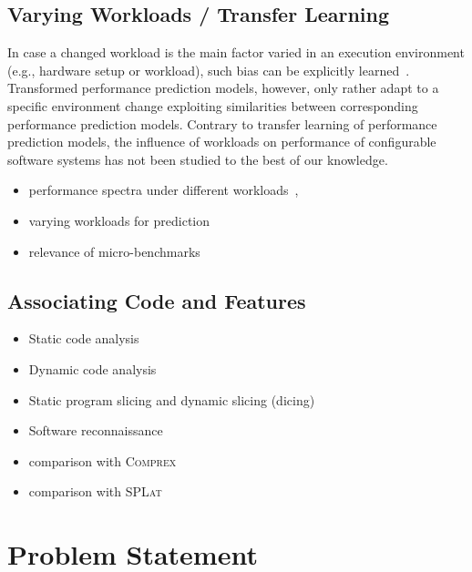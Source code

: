 \subsection{Varying Workloads / Transfer Learning}
In case a changed workload is the main factor varied in an execution environment (e.g., hardware setup or workload), such bias can be explicitly learned~\cite{jamishidi_transfer_2017,jamshidi_learning_2018,jamshidi_transfer_gp_2017,ding_bayesian_2020}. Transformed performance prediction models, however, only rather adapt to a specific environment change exploiting similarities between corresponding performance prediction models. Contrary to transfer learning of performance prediction models, the influence of workloads on performance of configurable software systems has not been studied to the best of our knowledge.

\begin{itemize}
	\item performance spectra under different workloads~\cite{alves_sampling_2020}, 
	\item varying workloads for prediction~\cite{liao_2020_using_emse}
	\item relevance of micro-benchmarks \cite{laaber_emse_2021,grambow_peerj_2021}
\end{itemize}

\subsection{Associating Code and Features}
\begin{itemize}
	\item Static code analysis\cite{velez_2020_configcrusher_jase,lillack_2018_lotrack_tse,luo_2019_cova}
	\item Dynamic code analysis \cite{bell_phosphor_2014,velez_comprex_2021}
	\item Static program slicing and dynamic slicing (dicing)
	\item Software reconnaissance ~\cite{wong_integrated_2005,wilde_early_1996,agrawal_fault_1995,simmons_industrial_2006,chen_dynamic_nodate,sherwood_reducing_nodate}
\end{itemize}
\begin{itemize}
	\item comparison with \textsc{Comprex}~\cite{velez_comprex_2021}
	\item comparison with \textsc{SPLat}
\end{itemize}


\section{Problem Statement}
